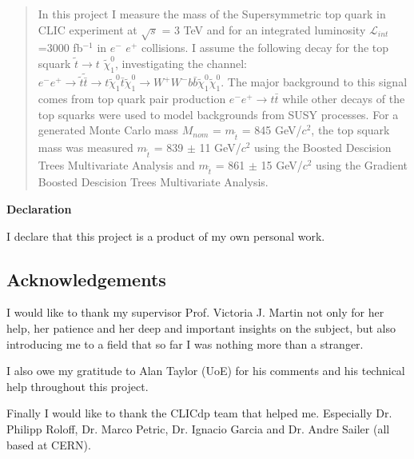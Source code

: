 \documentclass[12pt,a4paper]{report}
\begin{document}
\newpage



\begin{abstract}
In this project I measure the mass of the Supersymmetric top quark in CLIC experiment at $\sqrt{s}$ = 3 TeV
and for an integrated luminosity $\mathcal{L}_{int}$=3000 fb$^{-1}$
in $e^{-}$ $e^{+}$ collisions. I assume the following decay for the top squark $\tilde{t} \rightarrow t$ $\tilde{\chi}_{1}^{0}$, 
investigating the channel:
 $e^{-} e^{+} \rightarrow \tilde{t} \tilde{\bar{t}} \rightarrow t\tilde{\chi}_{1}^{0} \bar{t}\tilde{\chi}_{1}^{0}
 \rightarrow W^{+}W^{-}b\bar{b} \tilde{\chi}_{1}^{0} \tilde{\chi}_{1}^{0}$. 
The major background to this signal comes from top quark pair production $e^{-}e^{+}\rightarrow t\bar{t}$
while other decays of the top squarks were used to model backgrounds from SUSY processes. 
For a generated Monte Carlo mass $M_{nom}$ = $m_{\tilde{t}}$ = 845 GeV/$c^{2}$, the top squark mass was 
measured $m_{\tilde{t}}$ = 839 $\pm$ 11 GeV/$c^{2}$ using the Boosted Descision 
Trees Multivariate Analysis and $m_{\tilde{t}}$ = 861 $\pm$ 15 GeV/$c^{2}$ using the Gradient Boosted Descision  Trees Multivariate Analysis. 
\end{abstract}



\textbf{Declaration}

I declare that this project is a product of my own personal work.


\newpage

\tableofcontents
\listoftables
\listoffigures

\begin{titlepage}
\vspace*{2in}
\section*{Acknowledgements}

I would like to thank my supervisor Prof. Victoria J. Martin not only for her help, her patience and
her deep and important insights on the subject, but also introducing me to a field that so far I was nothing 
more than a stranger.

I also owe my gratitude to Alan Taylor (UoE) for his comments and his technical help throughout this 
project.

Finally I would like to thank the CLICdp team that helped me. Especially
Dr. Philipp Roloff, Dr. Marco Petric, Dr. Ignacio Garcia and Dr. Andre Sailer (all based at CERN).


\end{titlepage}
\end{document}

